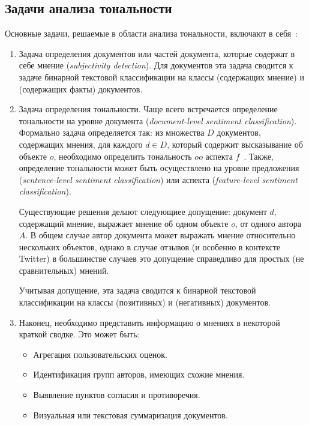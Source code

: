 \subsection{Задачи анализа тональности}

Основные задачи, решаемые в области анализа тональности, включают в себя~\cite{panglee}:
\begin{enumerate}


\item {
  Задача определения документов или частей документа, которые содержат в себе мнение (\textit{subjectivity detection}). Для документов эта задача сводится к задаче бинарной текстовой классификации на классы {} (содержащих мнение) и {} (содержащих факты) документов.
}

\item {
  Задача определения тональности. Чаще всего встречается определение тональности на уровне документа (\textit{document-level sentiment classification}). Формально задача определяется так: 
  из множества $D$ документов, содержащих мнения, для каждого $d \in D$, который содержит высказывание об объекте $o$, необходимо определить тональность $oo$ аспекта $f$~\cite{sentsubj}. 
  Также, определение тональности может быть осуществлено на уровне предложения (\textit{sentence-level sentiment classification}) или аспекта (\textit{feature-level sentiment classification}).

  Существующие решения делают следующиее допущение: документ $d$, содержащий мнение, выражает мнение об одном объекте $o$, от одного автора $A$. В общем случае автор документа может выражать мнение относительно нескольких объектов, однако в случае отзывов (и особенно в контексте Twitter) в большинстве случаев это допущение справедливо для простых (не сравнительных) мнений.

  Учитывая допущение, эта задача сводится к бинарной текстовой классификации на классы {} (позитивных) и {} (негативных) документов.
}

\item {
  Наконец, необходимо представить информацию о мнениях в некоторой краткой сводке. Это может быть:
  \begin{itemize}

  \item{
    Агрегация пользовательских оценок.
  }

  \item{
    Идентификация групп авторов, имеющих схожие мнения.
  }


  \item{
    Выявление пунктов согласия и противоречия.
  }

   \item{
    Визуальная или текстовая суммаризация документов.
  }

  \end{itemize}
}

\end{enumerate}

